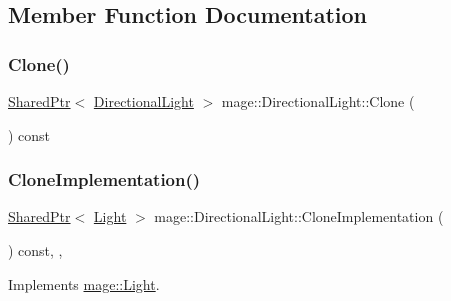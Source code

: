 \subsection{Member Function Documentation}
\hypertarget{classmage_1_1_directional_light_af68699d987bbb1170f76cdfe8bdf8c1d}{}\label{classmage_1_1_directional_light_af68699d987bbb1170f76cdfe8bdf8c1d} 
\subsubsection{\texorpdfstring{Clone()}{Clone()}}
{\footnotesize\ttfamily \hyperlink{namespacemage_a1e01ae66713838a7a67d30e44c67703e}{Shared\+Ptr}$<$ \hyperlink{classmage_1_1_directional_light}{Directional\+Light} $>$ mage\+::\+Directional\+Light\+::\+Clone (\begin{DoxyParamCaption}{ }\end{DoxyParamCaption}) const}

\hypertarget{classmage_1_1_directional_light_a93479af178401eeaf6fe0f16b1f97ad9}{}\label{classmage_1_1_directional_light_a93479af178401eeaf6fe0f16b1f97ad9} 
\subsubsection{\texorpdfstring{Clone\+Implementation()}{CloneImplementation()}}
{\footnotesize\ttfamily \hyperlink{namespacemage_a1e01ae66713838a7a67d30e44c67703e}{Shared\+Ptr}$<$ \hyperlink{classmage_1_1_light}{Light} $>$ mage\+::\+Directional\+Light\+::\+Clone\+Implementation (\begin{DoxyParamCaption}{ }\end{DoxyParamCaption}) const\hspace{0.3cm}{\ttfamily [override]}, {\ttfamily [private]}, {\ttfamily [virtual]}}



Implements \hyperlink{classmage_1_1_light_a53ef28bad86a1a307db90cb265db4798}{mage\+::\+Light}.

\hypertarget{classmage_1_1_directional_light_a36df91928dfdb33d3e333d8c51332462}{}\label{classmage_1_1_directional_light_a36df91928dfdb33d3e333d8c51332462} 
